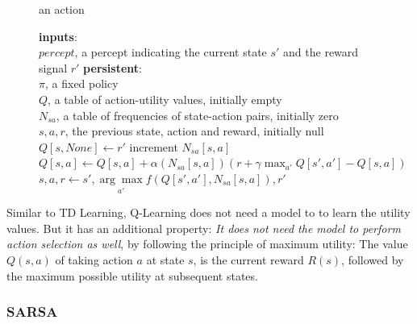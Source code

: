 \documentclass[11pt]{article}
\begin{document}
\begin{figure}[!htb]
\begin{algorithmic}[1]
 \Return an action

\State \textbf{inputs}: \\
\hspace*{\algorithmicindent} \hspace*{\algorithmicindent} $percept$, a percept indicating the current state $s'$ and the reward signal $r'$
\State \textbf{persistent}: \\
\hspace*{\algorithmicindent} \hspace*{\algorithmicindent} $\pi$, a fixed policy\\
\hspace*{\algorithmicindent} \hspace*{\algorithmicindent} $Q$, a table of action-utility values, initially empty\\
\hspace*{\algorithmicindent} \hspace*{\algorithmicindent} $N_{sa}$, a table of frequencies of state-action pairs, initially zero\\
\hspace*{\algorithmicindent} \hspace*{\algorithmicindent} $s, a, r$, the previous state, action and reward, initially null\\

 $Q[s, None] \leftarrow r'$ \EndIf
{}
\State increment $N_{sa}[s, a]$
\State $Q[s, a] \leftarrow Q[s, a] + \alpha(N_{sa}[s, a]) \left( r + \gamma \max_{a'} Q[s', a'] - Q[s, a] \right)$
\EndIf
\State $s,a,r \leftarrow s', \underset{a'}{\arg\max} f(Q[s', a'], N_{sa}[s, a]), r'$
\EndProcedure
\end{algorithmic}
\end{figure}

Similar to TD Learning, Q-Learning does not need a model to to learn the utility values. But it has an additional property: \textit{It does not need the model to perform action selection as well}, by following the principle of maximum utility: The value $Q(s, a)$ of taking action $a$ at state $s$, is the current reward $R(s)$, followed by the maximum possible utility at subsequent states.

\subsubsection{SARSA}
\end{document}
